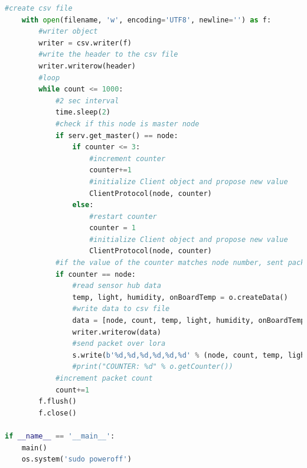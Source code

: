 \documentclass[oneside,12pt]{book}
\begin{document}
\begin{lstlisting}[language={Python},caption={Paxos Sender code - Python3},captionpos=b,label={lst:paxos_sender}]
    #create csv file
    with open(filename, 'w', encoding='UTF8', newline='') as f:
        #writer object
        writer = csv.writer(f)
        #write the header to the csv file
        writer.writerow(header)
        #loop 
        while count <= 1000:
		    #2 sec interval
            time.sleep(2)
            #check if this node is master node			 
            if serv.get_master() == node:
                if counter <= 3:
                    #increment counter				
                    counter+=1
					#initialize Client object and propose new value
					ClientProtocol(node, counter)
                else:
				    #restart counter
                    counter = 1
					#initialize Client object and propose new value
					ClientProtocol(node, counter)
			#if the value of the counter matches node number, sent packet		
            if counter == node:
                #read sensor hub data
                temp, light, humidity, onBoardTemp = o.createData()
                #write data to csv file
                data = [node, count, temp, light, humidity, onBoardTemp]
                writer.writerow(data)
                #send packet over lora
                s.write(b'%d,%d,%d,%d,%d,%d' % (node, count, temp, light, humidity, onBoardTemp)) 
                #print("COUNTER: %d" % o.getCounter())
            #increment packet count
            count+=1
        f.flush()
        f.close()
        
if __name__ == '__main__':
    main()
    os.system('sudo poweroff')
\end{lstlisting}
\end{document}
